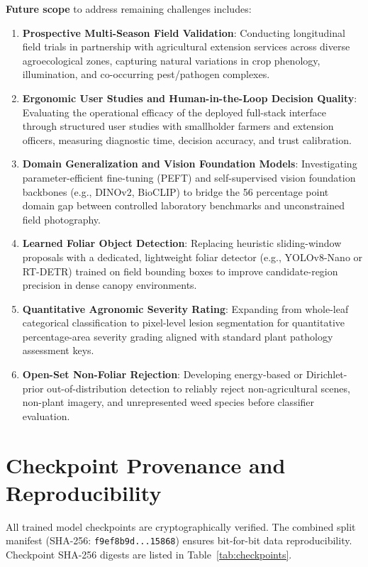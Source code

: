 \documentclass[pdflatex,sn-mathphys-num]{sn-jnl}
\theoremstyle{thmstyleone}%
\theoremstyle{thmstyletwo}%
\theoremstyle{thmstylethree}%
\begin{document}
\textbf{Future scope} to address remaining challenges includes:
\begin{enumerate}
  \item \textbf{Prospective Multi-Season Field Validation}: Conducting longitudinal field trials in partnership with agricultural extension services across diverse agroecological zones, capturing natural variations in crop phenology, illumination, and co-occurring pest/pathogen complexes.
  \item \textbf{Ergonomic User Studies and Human-in-the-Loop Decision Quality}: Evaluating the operational efficacy of the deployed full-stack interface through structured user studies with smallholder farmers and extension officers, measuring diagnostic time, decision accuracy, and trust calibration.
  \item \textbf{Domain Generalization and Vision Foundation Models}: Investigating parameter-efficient fine-tuning (PEFT) and self-supervised vision foundation backbones (e.g., DINOv2, BioCLIP) to bridge the 56 percentage point domain gap between controlled laboratory benchmarks and unconstrained field photography.
  \item \textbf{Learned Foliar Object Detection}: Replacing heuristic sliding-window proposals with a dedicated, lightweight foliar detector (e.g., YOLOv8-Nano or RT-DETR) trained on field bounding boxes to improve candidate-region precision in dense canopy environments.
  \item \textbf{Quantitative Agronomic Severity Rating}: Expanding from whole-leaf categorical classification to pixel-level lesion segmentation for quantitative percentage-area severity grading aligned with standard plant pathology assessment keys.
  \item \textbf{Open-Set Non-Foliar Rejection}: Developing energy-based or Dirichlet-prior out-of-distribution detection to reliably reject non-agricultural scenes, non-plant imagery, and unrepresented weed species before classifier evaluation.
\end{enumerate}

\section*{Checkpoint Provenance and Reproducibility}

All trained model checkpoints are cryptographically verified. The combined split
manifest (SHA-256: \texttt{f9ef8b9d...15868}) ensures bit-for-bit data reproducibility.
Checkpoint SHA-256 digests are listed in Table~\ref{tab:checkpoints}.
\end{document}
